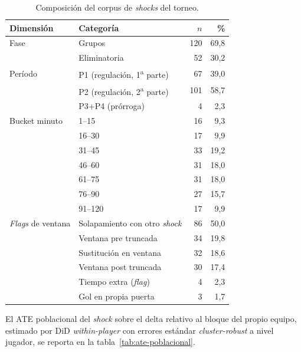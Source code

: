 \begin{table}[h]
  \centering
  \small
  \caption{Composición del corpus de \textit{shocks} del torneo.}
  \label{tab:corpus-shocks}
  \begin{tabular}{llrr}
    \toprule
    Dimensión & Categoría & $n$ & \% \\
    \midrule
    Fase & Grupos        & 120 & 69{,}8 \\
         & Eliminatoria  &  52 & 30{,}2 \\
    \midrule
    Período & P1 (regulación, 1\textsuperscript{a} parte)  &  67 & 39{,}0 \\
            & P2 (regulación, 2\textsuperscript{a} parte)  & 101 & 58{,}7 \\
            & P3+P4 (prórroga)                              &   4 &  2{,}3 \\
    \midrule
    Bucket minuto & 1--15  & 16 &  9{,}3 \\
                  & 16--30 & 17 &  9{,}9 \\
                  & 31--45 & 33 & 19{,}2 \\
                  & 46--60 & 31 & 18{,}0 \\
                  & 61--75 & 31 & 18{,}0 \\
                  & 76--90 & 27 & 15{,}7 \\
                  & 91--120 & 17 &  9{,}9 \\
    \midrule
    \textit{Flags} de ventana  & Solapamiento con otro \textit{shock} & 86 & 50{,}0 \\
                               & Ventana pre truncada                  & 34 & 19{,}8 \\
                               & Sustitución en ventana                & 32 & 18{,}6 \\
                               & Ventana post truncada                 & 30 & 17{,}4 \\
                               & Tiempo extra (\textit{flag})          &  4 &  2{,}3 \\
                               & Gol en propia puerta                  &  3 &  1{,}7 \\
    \bottomrule
  \end{tabular}
\end{table}

El ATE poblacional del
\textit{shock} sobre el delta relativo al bloque del propio equipo,
estimado por DiD \textit{within-player} con errores estándar
\textit{cluster-robust} a nivel jugador, se reporta en la
tabla~\ref{tab:ate-poblacional}.

